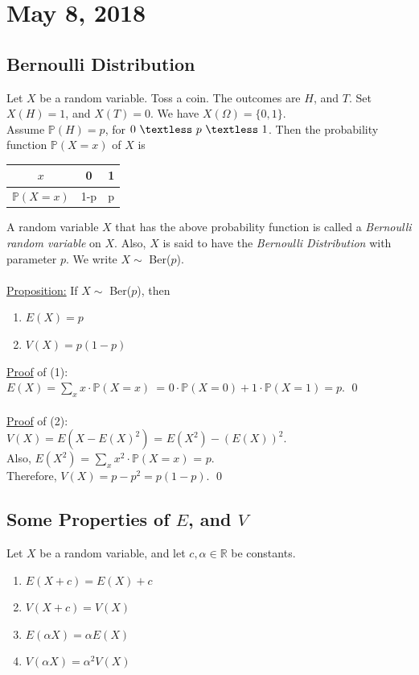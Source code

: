 \documentclass{article}
\newcommand{\ti}[1]{\textit{#1}}
\newcommand{\R}{\mathbb{R}}
\newcommand{\bbP}{\mathbb{P}}
\newcommand{\Om}{\Omega}
\newcommand{\lt}{\textless}
\begin{document}

\section{May 8, 2018}
\subsection{Bernoulli Distribution}
Let $X$ be a random variable. Toss a coin. The outcomes are $H$, and $T$. Set $X(H) = 1$, and $X(T) = 0$. We have $X(\Om) = \{0, 1\}$.\\ Assume $\bbP(H) = p$, for $0\ \lt\ p\ \lt\ 1$. Then the probability function $\bbP(X=x)$ of $X$ is
\begin{center}
\begin{tabular}{| c || c | c |}
\hline
$x$ & 0 & 1\\
\hline
$\bbP(X = x)$ & 1-p & p\\
\hline
\end{tabular}
\end{center}
A random variable $X$ that has the above probability function is called a \ti{Bernoulli random variable} on $X$. Also, $X$ is said to have the \ti{Bernoulli Distribution} with parameter $p$. We write $X \sim$ Ber($p$).\\\\
\underline{Proposition:} If $X \sim$ Ber($p$), then
\begin{enumerate}
	\item $E(X) = p$
	\item $V(X) = p(1-p)$
\end{enumerate}
\underline{Proof} of (1):\\
$E(X) = \sum_{x} x\cdot \bbP(X=x)$\ = $0\cdot \bbP(X=0) + 1\cdot \bbP(X=1) = p.$ \qed \\\\
\underline{Proof} of (2):\\
$V(X) = E(X-E(X)^{2})$ = $E(X^{2}) - (E(X))^{2}$.\\
Also, $E(X^{2})$ = $\sum_{x} x^{2}\cdot \bbP(X=x)$ = $p$.\\
Therefore, $V(X) = p-p^{2} = p(1-p)$. \qed
\subsection{Some Properties of $E$, and $V$}
Let $X$ be a random variable, and let $c, \alpha \in \R$ be constants.
\begin{enumerate}
	\item $E(X+c)=E(X)+c$
	\item $V(X+c)=V(X)$
	\item $E(\alpha X)=\alpha E(X)$
	\item $V(\alpha X)=\alpha^{2} V(X)$
\end{enumerate}
\ \\\\
\end{document}
